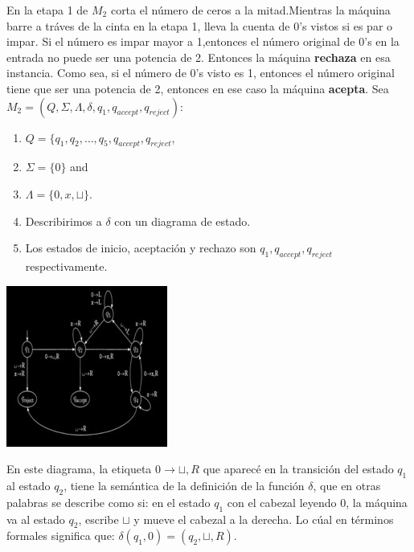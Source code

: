 \documentclass[10pt]{report}
\begin{document}
    En la etapa 1 de $M_{2}$ corta el número de ceros a la mitad.Mientras la máquina barre a tráves de la cinta en la
    etapa 1, lleva la cuenta de $0$'s vistos si es par o impar. Si el número es impar mayor a 1,entonces el número original
    de $0$'s en la entrada no puede ser una potencia de 2. Entonces la máquina \textbf{rechaza} en esa instancia.
    Como sea, si el número de 0's visto es 1, entonces el número original tiene que ser una potencia de 2, entonces en ese
    caso la máquina \textbf{acepta}.
    Sea $M_{2} =(Q,\Sigma,\Lambda,\delta,q_{1},q_{accept},q_{reject})$:
    \begin{enumerate}
        \item $Q = \{q_{1},q_{2},\dots,q_{5},q_{accept},q_{reject}$,
        \item $\Sigma = \{ 0 \}$ and
        \item $\Lambda = \{0,x,\sqcup \}$.
        \item Describirimos a $\delta$ con un diagrama de estado.
        \item Los estados de inicio, aceptación y rechazo son $q_{1},q_{accept},q_{reject}$ respectivamente.
    \end{enumerate}
    \newline
    \begin{center}
        \includegraphics{Im_1.jpg}
    \end{center}
    \newline
    En este diagrama, la etiqueta $0\rightarrow \sqcup,R$ que aparecé en la transición del estado $q_{1}$ al estado $q_{2}$,
    tiene la semántica de la definición de la función $\delta$, que en otras palabras se describe como si:
    en el estado $q_{1}$ con el cabezal leyendo $0$, la máquina va al estado $q_{2}$, escribe $\sqcup$ y mueve el cabezal
    a la derecha.\newline
    Lo cúal en términos formales significa que: $\delta(q_{1},0) = (q_{2},\sqcup, R)$.
\end{document}
